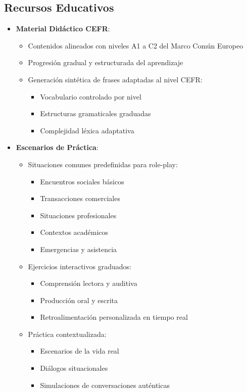 \subsection{Recursos Educativos}
\begin{itemize}
	\item \textbf{Material Didáctico CEFR}:
	      \begin{itemize}
		      \item Contenidos alineados con niveles A1 a C2 del Marco Común Europeo
		      \item Progresión gradual y estructurada del aprendizaje
		      \item Generación sintética de frases adaptadas al nivel CEFR:
		            \begin{itemize}
			            \item Vocabulario controlado por nivel
			            \item Estructuras gramaticales graduadas
			            \item Complejidad léxica adaptativa
		            \end{itemize}
	      \end{itemize}

	\item \textbf{Escenarios de Práctica}:
	      \begin{itemize}
		      \item Situaciones comunes predefinidas para role-play:
		            \begin{itemize}
			            \item Encuentros sociales básicos
			            \item Transacciones comerciales
			            \item Situaciones profesionales
			            \item Contextos académicos
			            \item Emergencias y asistencia
		            \end{itemize}
		      \item Ejercicios interactivos graduados:
		            \begin{itemize}
			            \item Comprensión lectora y auditiva
			            \item Producción oral y escrita
			            \item Retroalimentación personalizada en tiempo real
		            \end{itemize}
		      \item Práctica contextualizada:
		            \begin{itemize}
			            \item Escenarios de la vida real
			            \item Diálogos situacionales
			            \item Simulaciones de conversaciones auténticas
		            \end{itemize}
	      \end{itemize}
\end{itemize}
